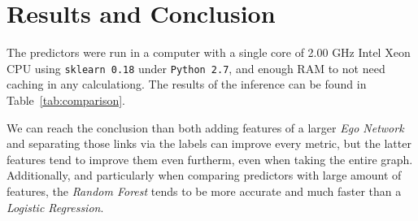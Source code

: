 \section{Results and Conclusion}
\label{sec:results}


The predictors were run in a computer with a single core of 2.00 GHz Intel Xeon CPU using \texttt{sklearn 0.18} under \texttt{Python 2.7}, and enough RAM to not need caching in any calculationg. The results of the inference can be found in Table~\ref{tab:comparison}.

We can reach the conclusion than both adding features of a larger \emph{Ego Network} and separating those links via the labels can improve every metric, but the latter features tend to improve them even furtherm, even when taking the entire graph. Additionally, and particularly when comparing predictors with large amount of features, the \emph{Random Forest} tends to be more accurate and much faster than a \emph{Logistic Regression}.
